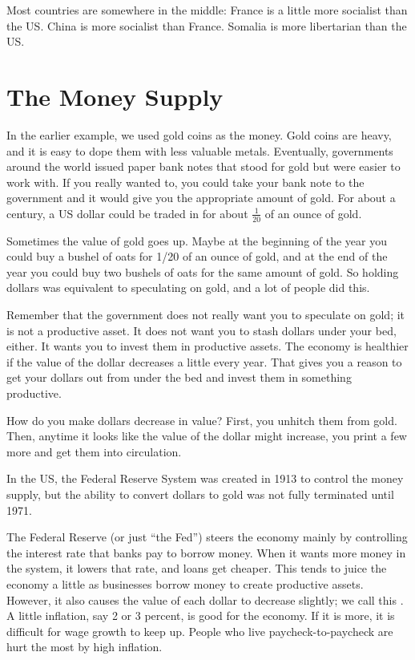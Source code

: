 Most countries are somewhere in the middle: France is a little more socialist than the US. China is more socialist than France. Somalia is more libertarian than the US.

\section{The Money Supply}

In the earlier example, we used gold coins as the money. Gold coins are heavy, and it is easy to dope them with less valuable metals. Eventually, governments around the world issued paper bank notes that
stood for gold but were easier to work with. If you really wanted to, you could take your bank note to the government and it would give you the appropriate amount of gold. For about a century, a US dollar could be traded in for about
$\frac{1}{20}$ of an ounce of gold.

Sometimes the value of gold goes up.  Maybe at the beginning of the year you could buy a bushel of oats for 1/20 of an ounce of gold, and at the end of the year you could buy two bushels of oats for the same amount of gold. So holding dollars was equivalent to speculating on gold, and a lot of people did this.

Remember that the government does not really want you to speculate on
gold; it is not a productive asset. It does not want you to stash dollars
under your bed, either. It wants you to invest them in productive assets.
The economy is healthier if the value of the dollar decreases a little
every year. That gives you a reason to get your dollars out from under the
bed and invest them in something productive.

How do you make dollars decrease in value? First, you unhitch them from gold. Then, anytime it looks like the value of the dollar might increase, you print a few more and get them into circulation.

In the US, the Federal Reserve System was created in 1913 to control the money supply, but the ability to convert dollars to gold was not fully terminated until 1971.

The Federal Reserve (or just ``the Fed'') steers the economy mainly by
controlling the interest rate that banks pay to borrow money. When it wants
more money in the system, it lowers that rate, and loans get cheaper. This tends to juice the economy a little as businesses borrow money to create productive assets. However, it also causes the value of each dollar to decrease slightly; we call this .  A little inflation, say 2 or 3 percent, is good for the economy. If it is more, it is difficult for wage growth to keep up. People who live paycheck-to-paycheck are hurt the most by high inflation.

